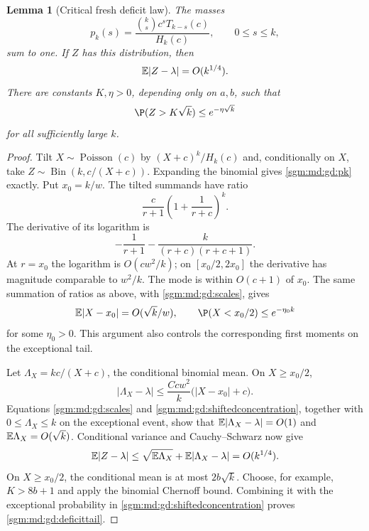 \documentclass[11pt,letterpaper]{article}
\newtheorem{lemma}[theorem]{Lemma}\newtheorem{proposition}[theorem]{Proposition}\newtheorem{corollary}[theorem]{Corollary}
\theoremstyle{remark}\newtheorem{remark}[theorem]{Remark}
\newcommand{\Poi}{\operatorname{Poisson}}\newcommand{\Bin}{\operatorname{Bin}}
\theoremstyle{definition}\newtheorem{definition}[theorem]{Definition}
\begin{document}
\begin{lemma}[Critical fresh deficit law]\label{sgm:md:gd:deficit}
The masses
\begin{equation}\label{sgm:md:gd:pk}
 p_k(s)=\frac{\binom{k}{s}c^sT_{k-s}(c)}{H_k(c)},
 \qquad 0\le s\le k,
\end{equation}
sum to one.  If $Z$ has this distribution, then
\begin{equation}\label{sgm:md:gd:deficitL1}
 \mathbb E|Z-\lambda|=O(k^{1/4}).
\end{equation}
There are constants $K,\eta>0$, depending only on $a,b$, such that
\begin{equation}\label{sgm:md:gd:deficittail}
 \P(Z>K\sqrt{k})\le e^{-\eta\sqrt{k}}
\end{equation}
for all sufficiently large $k$.
\end{lemma}
\begin{proof}
Tilt $X\sim\Poi(c)$ by $(X+c)^k/H_k(c)$ and, conditionally on $X$,
take $Z\sim\operatorname{Bin}(k,c/(X+c))$.  Expanding the binomial gives
\eqref{sgm:md:gd:pk} exactly.  Put $x_0=k/w$.  The tilted summands have ratio
\[
 \frac{c}{r+1}\left(1+\frac1{r+c}\right)^k.
\]
The derivative of its logarithm is
\[
 -\frac1{r+1}-\frac{k}{(r+c)(r+c+1)}.
\]
At $r=x_0$ the logarithm is $O(cw^2/k)$; on
$[x_0/2,2x_0]$ the derivative has magnitude comparable to $w^2/k$.
The mode is within $O(c+1)$ of $x_0$.  The same summation of ratios as
above, with \eqref{sgm:md:gd:scales}, gives
\begin{equation}\label{sgm:md:gd:shiftedconcentration}
 \E|X-x_0|=O(\sqrt{k}/w),\qquad
 \P(X<x_0/2)\le e^{-\eta_0 k}
\end{equation}
for some $\eta_0>0$.  This argument also controls the corresponding
first moments on the exceptional tail.

Let $\Lambda_X=kc/(X+c)$, the conditional binomial mean.  On
$X\ge x_0/2$,
\[
 |\Lambda_X-\lambda|
 \le \frac{Ccw^2}{k}\bigl(|X-x_0|+c\bigr).
\]
Equations \eqref{sgm:md:gd:scales} and \eqref{sgm:md:gd:shiftedconcentration}, together
with $0\le\Lambda_X\le k$ on the exceptional event, show that
$\mathbb E|\Lambda_X-\lambda|=O(1)$ and $\mathbb E\Lambda_X=O(\sqrt{k})$.
Conditional variance and Cauchy--Schwarz now give
\[
 \mathbb E|Z-\lambda|
 \le \sqrt{\mathbb E\Lambda_X}+\mathbb E|\Lambda_X-\lambda|
 =O(k^{1/4}).
\]
On $X\ge x_0/2$, the conditional mean is at most $2b\sqrt{k}$.
Choose, for example, $K>8b+1$ and apply the binomial Chernoff bound.
Combining it with the exceptional probability in
\eqref{sgm:md:gd:shiftedconcentration} proves \eqref{sgm:md:gd:deficittail}.
\end{proof}
\end{document}
